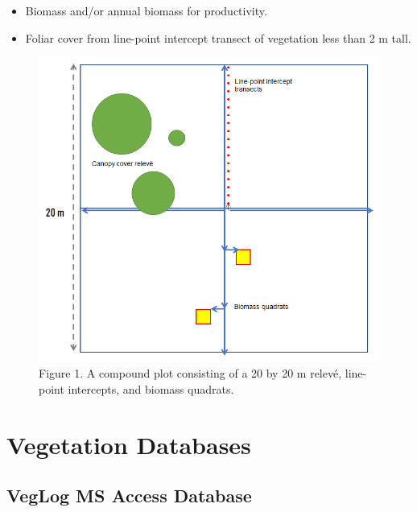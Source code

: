 \documentclass[
]{book}
\begin{document}
\begin{itemize}
\item
  Biomass and/or annual biomass for productivity.
\item
  Foliar cover from line-point intercept transect of vegetation less than 2 m tall.
\end{itemize}

\begin{figure}
\centering
\includegraphics{static-figures/plot.png}
\caption{Figure 1. A compound plot consisting of a 20 by 20 m relevé, line-point intercepts, and biomass quadrats.}
\end{figure}

\hypertarget{vegetation-databases}{%
\chapter{Vegetation Databases}\label{vegetation-databases}}

\hypertarget{veglog-ms-access-database}{%
\section{VegLog MS Access Database}\label{veglog-ms-access-database}}
\end{document}
